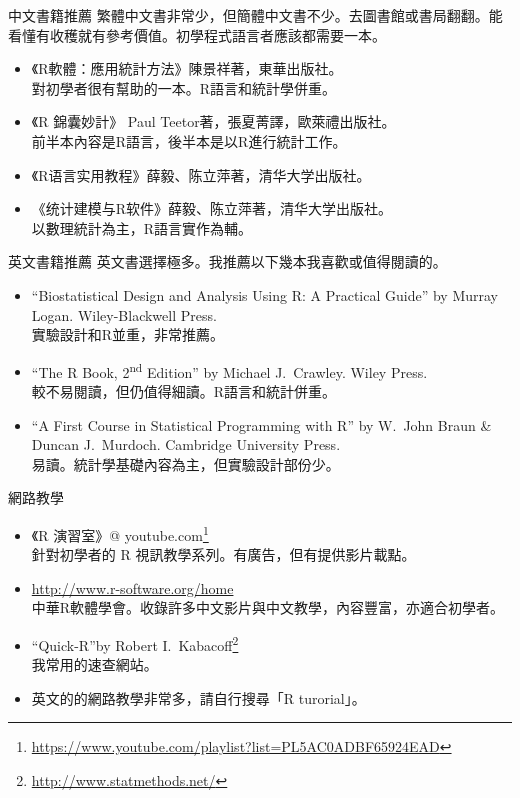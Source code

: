 \documentclass[14pt, aspectratio=43]{beamer}
\let\oldfootnote\footnote
\renewcommand\footnote[1]{\hspace{-0.7em}\oldfootnote{\ignorespaces#1}\hspace{0.5em}}
\begin{document}
\begin{frame}{中文書籍推薦}
繁體中文書非常少，但簡體中文書不少。去圖書館或書局翻翻。能看懂有收穫就有參考價值。初學程式語言者應該都需要一本。
\begin{itemize}
\item 《R軟體：應用統計方法》陳景祥著，東華出版社。\\ 對初學者很有幫助的一本。R語言和統計學併重。
\item 《R 錦囊妙計》 Paul Teetor著，張夏菁譯，歐萊禮出版社。\\ 前半本內容是R語言，後半本是以R進行統計工作。
\item {《R语言实用教程》薛毅、陈立萍著，清华大学出版社。}
\item {《统计建模与R软件》薛毅、陈立萍著，清华大学出版社。} \\ 以數理統計為主，R語言實作為輔。
\end{itemize}
\end{frame}

\begin{frame}{英文書籍推薦}
英文書選擇極多。我推薦以下幾本我喜歡或值得閱讀的。
\begin{itemize}
\item ``Biostatistical Design and Analysis Using R: A Practical Guide'' by Murray Logan. Wiley-Blackwell Press.\\ 實驗設計和R並重，非常推薦。
\item ``The R Book, 2\textsuperscript{nd} Edition'' by Michael J.~Crawley. Wiley Press. \\ 較不易閱讀，但仍值得細讀。R語言和統計併重。
\item ``A First Course in Statistical Programming with R'' by W.~John Braun \& Duncan J.~Murdoch. Cambridge University Press. \\ 易讀。統計學基礎內容為主，但實驗設計部份少。
\end{itemize}
\end{frame}


\begin{frame}{網路教學}
\begin{itemize}
\item 《R 演習室》\makeatletter @ \makeatother youtube.com\oldfootnote{\url{https://www.youtube.com/playlist?list=PL5AC0ADBF65924EAD}} \\ 針對初學者的 R 視訊教學系列。有廣告，但有提供影片載點。
\item \url{http://www.r-software.org/home} \\ 中華R軟體學會。收錄許多中文影片與中文教學，內容豐富，亦適合初學者。
\item ``Quick-R''by Robert I.~Kabacoff\oldfootnote{\url{http://www.statmethods.net/}}\\ 我常用的速查網站。
\item 英文的的網路教學非常多，請自行搜尋「R turorial」。
\end{itemize}
\end{frame}
\end{document}
